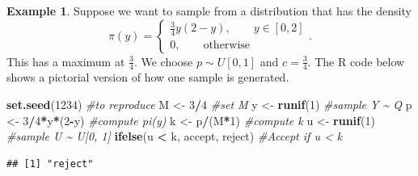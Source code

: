\documentclass[
]{book}
\newenvironment{Shaded}{\begin{snugshade}}{\end{snugshade}}
\newcommand{\CommentTok}[1]{\textcolor[rgb]{0.56,0.35,0.01}{\textit{#1}}}
\newcommand{\DecValTok}[1]{\textcolor[rgb]{0.00,0.00,0.81}{#1}}
\newcommand{\FunctionTok}[1]{\textcolor[rgb]{0.13,0.29,0.53}{\textbf{#1}}}
\newcommand{\NormalTok}[1]{#1}
\newcommand{\OtherTok}[1]{\textcolor[rgb]{0.56,0.35,0.01}{#1}}
\newcommand{\SpecialCharTok}[1]{\textcolor[rgb]{0.81,0.36,0.00}{\textbf{#1}}}
\newcommand{\StringTok}[1]{\textcolor[rgb]{0.31,0.60,0.02}{#1}}
\theoremstyle{definition}
\theoremstyle{definition}
\newtheorem{example}{Example}[chapter]
\theoremstyle{definition}
\theoremstyle{definition}
\theoremstyle{remark}
\begin{document}
\begin{example}
Suppose we want to sample from a distribution that has the density
\[
\pi(y) = \begin{cases}
\frac{3}{4}y(2-y), \qquad y \in [0, 2] \\
0, \qquad \textrm{otherwise}
\end{cases}.
\]
This has a maximum at \(\frac{3}{4}\). We choose \(p \sim U[0, 1]\) and \(c = \frac{3}{4}\). The R code below shows a pictorial version of how one sample is generated.

\begin{Shaded}
\begin{Highlighting}[]
\FunctionTok{set.seed}\NormalTok{(}\DecValTok{1234}\NormalTok{)   }\CommentTok{\#to reproduce}
\NormalTok{M }\OtherTok{\textless{}{-}} \DecValTok{3}\SpecialCharTok{/}\DecValTok{4}         \CommentTok{\#set M}
\NormalTok{y }\OtherTok{\textless{}{-}} \FunctionTok{runif}\NormalTok{(}\DecValTok{1}\NormalTok{)    }\CommentTok{\#sample Y \textasciitilde{} Q}
\NormalTok{p }\OtherTok{\textless{}{-}} \DecValTok{3}\SpecialCharTok{/}\DecValTok{4}\SpecialCharTok{*}\NormalTok{y}\SpecialCharTok{*}\NormalTok{(}\DecValTok{2}\SpecialCharTok{{-}}\NormalTok{y) }\CommentTok{\#compute pi(y)}
\NormalTok{k }\OtherTok{\textless{}{-}}\NormalTok{ p}\SpecialCharTok{/}\NormalTok{(M}\SpecialCharTok{*}\DecValTok{1}\NormalTok{)     }\CommentTok{\#compute k}
\NormalTok{u }\OtherTok{\textless{}{-}} \FunctionTok{runif}\NormalTok{(}\DecValTok{1}\NormalTok{)    }\CommentTok{\#sample U \textasciitilde{} U[0, 1]}
\FunctionTok{ifelse}\NormalTok{(u }\SpecialCharTok{\textless{}}\NormalTok{ k, }\StringTok{\textquotesingle{}accept\textquotesingle{}}\NormalTok{, }\StringTok{\textquotesingle{}reject\textquotesingle{}}\NormalTok{) }\CommentTok{\#Accept if  u \textless{} k}
\end{Highlighting}
\end{Shaded}

\begin{verbatim}
## [1] "reject"
\end{verbatim}


\end{example}
\end{document}
